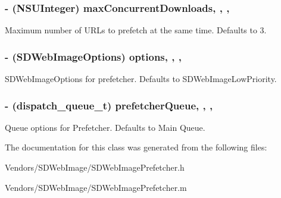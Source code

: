 \subsubsection[{max\+Concurrent\+Downloads}]{\setlength{\rightskip}{0pt plus 5cm}-\/ (N\+S\+U\+Integer) max\+Concurrent\+Downloads\hspace{0.3cm}{\ttfamily [read]}, {\ttfamily [write]}, {\ttfamily [nonatomic]}, {\ttfamily [assign]}}\label{interface_s_d_web_image_prefetcher_a9dd137551c61f4f73f636bf21eb23e7d}
Maximum number of U\+R\+Ls to prefetch at the same time. Defaults to 3. \hypertarget{interface_s_d_web_image_prefetcher_afdc1313a083c12e78cecebfcf22eeb8f}{}
\subsubsection[{options}]{\setlength{\rightskip}{0pt plus 5cm}-\/ (S\+D\+Web\+Image\+Options) options\hspace{0.3cm}{\ttfamily [read]}, {\ttfamily [write]}, {\ttfamily [nonatomic]}, {\ttfamily [assign]}}\label{interface_s_d_web_image_prefetcher_afdc1313a083c12e78cecebfcf22eeb8f}
S\+D\+Web\+Image\+Options for prefetcher. Defaults to S\+D\+Web\+Image\+Low\+Priority. \hypertarget{interface_s_d_web_image_prefetcher_a8022c3037744d6a740df2af0b67f927b}{}
\subsubsection[{prefetcher\+Queue}]{\setlength{\rightskip}{0pt plus 5cm}-\/ (dispatch\+\_\+queue\+\_\+t) prefetcher\+Queue\hspace{0.3cm}{\ttfamily [read]}, {\ttfamily [write]}, {\ttfamily [nonatomic]}, {\ttfamily [assign]}}\label{interface_s_d_web_image_prefetcher_a8022c3037744d6a740df2af0b67f927b}
Queue options for Prefetcher. Defaults to Main Queue. 

The documentation for this class was generated from the following files\+:\begin{DoxyCompactItemize}
\item 
Vendors/\+S\+D\+Web\+Image/S\+D\+Web\+Image\+Prefetcher.\+h\item 
Vendors/\+S\+D\+Web\+Image/S\+D\+Web\+Image\+Prefetcher.\+m\end{DoxyCompactItemize}
